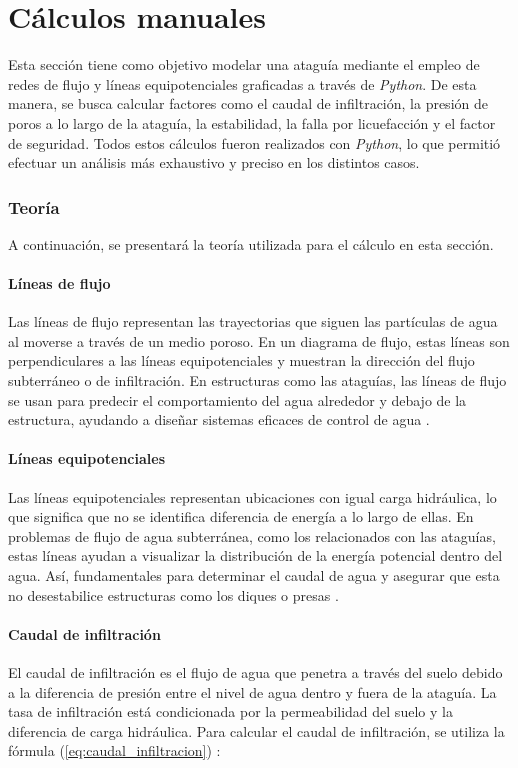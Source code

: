 \part{Cálculos manuales}

Esta sección tiene como objetivo modelar una ataguía mediante el empleo de redes de flujo y líneas equipotenciales graficadas a través de \textit{Python}. De esta manera, se busca calcular factores como el caudal de infiltración, la presión de poros a lo largo de la ataguía, la estabilidad, la falla por licuefacción y el factor de seguridad. Todos estos cálculos fueron realizados con \textit{Python}, lo que permitió efectuar un análisis más exhaustivo y preciso en los distintos casos.

\section{Teoría}

A continuación, se presentará la teoría utilizada para el cálculo en esta sección.

\subsection{Líneas de flujo}
Las líneas de flujo representan las trayectorias que siguen las partículas de agua al moverse a través de un medio poroso. En un diagrama de flujo, estas líneas son perpendiculares a las líneas equipotenciales y muestran la dirección del flujo subterráneo o de infiltración. En estructuras como las ataguías, las líneas de flujo se usan para predecir el comportamiento del agua alrededor y debajo de la estructura, ayudando a diseñar sistemas eficaces de control de agua \cite{structville}.

\subsection{Líneas equipotenciales}
Las líneas equipotenciales representan ubicaciones con igual carga hidráulica, lo que significa que no se identifica diferencia de energía a lo largo de ellas. En problemas de flujo de agua subterránea, como los relacionados con las ataguías, estas líneas ayudan a visualizar la distribución de la energía potencial dentro del agua. Así, fundamentales para determinar el caudal de agua y asegurar que esta no desestabilice estructuras como los diques o presas \cite{structville}.

\subsection{Caudal de infiltración}
El caudal de infiltración es el flujo de agua que penetra a través del suelo debido a la diferencia de presión entre el nivel de agua dentro y fuera de la ataguía. La tasa de infiltración está condicionada por la permeabilidad del suelo y la diferencia de carga hidráulica. Para calcular el caudal de infiltración, se utiliza la fórmula (\ref{eq:caudal_infiltracion}) \cite{stability_cofferdam_2024}:

